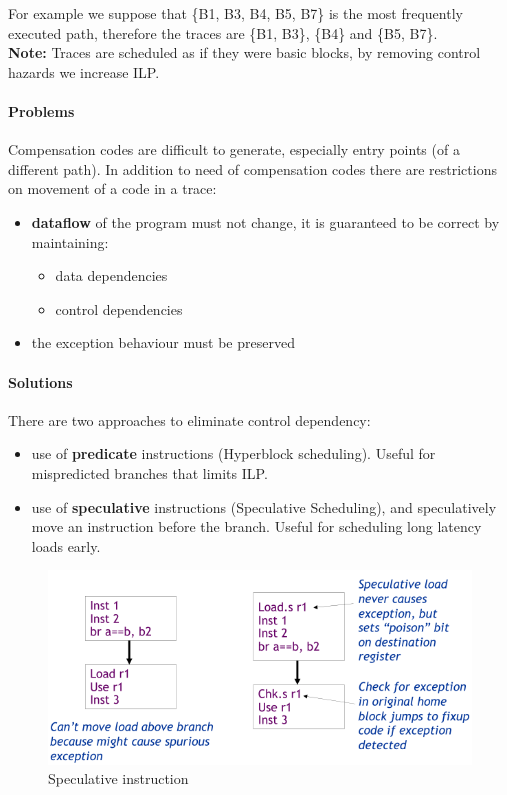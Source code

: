 For example we suppose that \{B1, B3, B4, B5, B7\} is the most frequently executed path, therefore the traces are
\{B1, B3\}, \{B4\} and \{B5, B7\}.\\
\textbf{Note:} Traces are scheduled as if they were basic blocks, by removing control hazards we increase ILP\@.

\paragraph{Problems} Compensation codes are difficult to generate, especially entry points (of a different path).
In addition to need of compensation codes there are
restrictions on movement of a code in a trace:
\begin{itemize}
    \item \textbf{dataflow} of the program must not change, it is guaranteed to be correct by maintaining:
    \begin{itemize}
        \item data dependencies
        \item control dependencies
    \end{itemize}
    \item the exception behaviour must be preserved
\end{itemize}


\paragraph{Solutions}There are two approaches to eliminate control dependency:
\begin{itemize}
    \item use of \textbf{predicate} instructions (Hyperblock scheduling).
    Useful for mispredicted branches that limits ILP\@.
    \item use of \textbf{speculative} instructions (Speculative Scheduling), and speculatively move an instruction
    before the branch.
    Useful for scheduling long latency loads early.
\end{itemize}

\begin{figure}[h]
    \centering
    \includegraphics[scale = 0.4]{images/speculative-instruction}
    \caption{Speculative instruction}
    \label{fig:speculative-instruction}
\end{figure}


